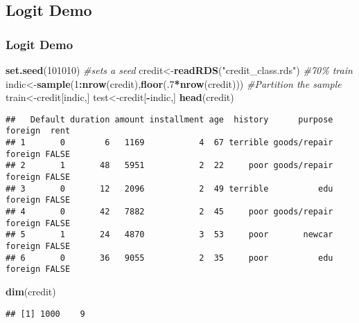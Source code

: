 \documentclass[
  shownotes,
  xcolor={svgnames},
  hyperref={colorlinks,citecolor=DarkBlue,linkcolor=DarkRed,urlcolor=DarkBlue}
  , aspectratio=169]{beamer}
\newenvironment{Shaded}{\begin{snugshade}}{\end{snugshade}}
\newcommand{\CommentTok}[1]{\textcolor[rgb]{0.56,0.35,0.01}{\textit{#1}}}
\newcommand{\DecValTok}[1]{\textcolor[rgb]{0.00,0.00,0.81}{#1}}
\newcommand{\KeywordTok}[1]{\textcolor[rgb]{0.13,0.29,0.53}{\textbf{#1}}}
\newcommand{\NormalTok}[1]{#1}
\newcommand{\OperatorTok}[1]{\textcolor[rgb]{0.81,0.36,0.00}{\textbf{#1}}}
\newcommand{\StringTok}[1]{\textcolor[rgb]{0.31,0.60,0.02}{#1}}
\begin{document}
\subsection{Logit Demo}
\begin{frame}[fragile]
\frametitle{Logit Demo}

\begin{scriptsize}
\begin{Shaded}
\begin{Highlighting}[]
\KeywordTok{set.seed}\NormalTok{(}\DecValTok{101010}\NormalTok{) }\CommentTok{\#sets a seed }
\NormalTok{credit\textless{}{-}}\KeywordTok{readRDS}\NormalTok{(}\StringTok{"credit\_class.rds"}\NormalTok{)}
\CommentTok{\#70\% train}
\NormalTok{indic\textless{}{-}}\KeywordTok{sample}\NormalTok{(}\DecValTok{1}\OperatorTok{:}\KeywordTok{nrow}\NormalTok{(credit),}\KeywordTok{floor}\NormalTok{(.}\DecValTok{7}\OperatorTok{*}\KeywordTok{nrow}\NormalTok{(credit)))}
\CommentTok{\#Partition the sample}
\NormalTok{train\textless{}{-}credit[indic,]}
\NormalTok{test\textless{}{-}credit[}\OperatorTok{{-}}\NormalTok{indic,]}
\KeywordTok{head}\NormalTok{(credit)}
\end{Highlighting}
\end{Shaded}
\end{scriptsize}
\begin{tiny}
\begin{verbatim}
##   Default duration amount installment age  history      purpose foreign  rent
## 1       0        6   1169           4  67 terrible goods/repair foreign FALSE
## 2       1       48   5951           2  22     poor goods/repair foreign FALSE
## 3       0       12   2096           2  49 terrible          edu foreign FALSE
## 4       0       42   7882           2  45     poor goods/repair foreign FALSE
## 5       1       24   4870           3  53     poor       newcar foreign FALSE
## 6       0       36   9055           2  35     poor          edu foreign FALSE
\end{verbatim}
\end{tiny}
\begin{scriptsize}


\begin{Shaded}
\begin{Highlighting}[]
\KeywordTok{dim}\NormalTok{(credit)}
\end{Highlighting}
\end{Shaded}
\end{scriptsize}
\begin{tiny}
\begin{verbatim}
## [1] 1000    9
\end{verbatim}
\end{tiny}


\end{frame}
\end{document}
